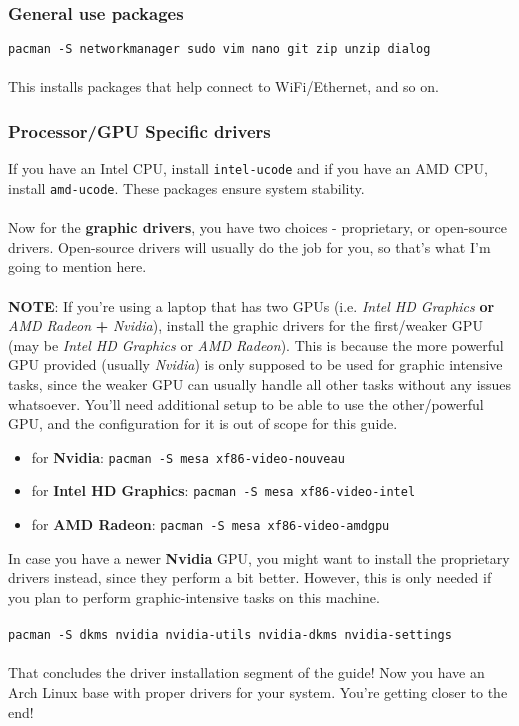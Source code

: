 \documentclass{article}
\begin{document}
\subsubsection{General use packages}
\texttt{pacman -S networkmanager sudo vim nano git zip unzip dialog}\\\\
This installs packages that help connect to WiFi/Ethernet, and so on. 
\subsubsection{Processor/GPU Specific drivers}
If you have an Intel CPU, install \texttt{intel-ucode} and if you have an AMD CPU, install \texttt{amd-ucode}. These packages ensure system stability.\\\\Now for the \textbf{graphic drivers}, you have two choices - proprietary, or open-source drivers. Open-source drivers will usually do the job for you, so that's what I'm going to mention here.
\\\\
\textbf{NOTE}: If you're using a laptop that has two GPUs (i.e. \textit{Intel HD Graphics}\textbf{ or }\textit{AMD Radeon} \textbf{+} \textit{Nvidia}), install the graphic drivers for the first/weaker GPU (may be \textit{Intel HD Graphics} or \textit{AMD Radeon}). This is because the more powerful GPU provided (usually \textit{Nvidia}) is only supposed to be used for graphic intensive tasks, since the weaker GPU can usually handle all other tasks without any issues whatsoever. You'll need additional setup to be able to use the other/powerful GPU, and the configuration for it is out of scope for this guide.
\\
\begin{itemize}
  \item for \textbf{Nvidia}: \texttt{pacman -S mesa xf86-video-nouveau}
  \item for \textbf{Intel HD Graphics}: \texttt{pacman -S mesa xf86-video-intel}

  \item for \textbf{AMD Radeon}: \texttt{pacman -S mesa xf86-video-amdgpu}
\end{itemize}

In case you have a newer \textbf{Nvidia} GPU, you might want to install the proprietary drivers instead, since they perform a bit better. However, this is only needed if you plan to perform graphic-intensive tasks on this machine.
\\\\
\texttt{pacman -S dkms nvidia nvidia-utils nvidia-dkms nvidia-settings}
\\\\
That concludes the driver installation segment of the guide!
Now you have an Arch Linux base with proper drivers for your system. You're getting closer to the end! 
\end{document}
